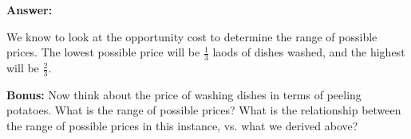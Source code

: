 \documentclass[12pt]{article}
\begin{document}
\begin{enumerate}
\medskip

\textbf{Answer:}

We know to look at the opportunity cost to determine the range of possible prices. The lowest possible price will be $\frac{1}{3}$ laods of dishes washed, and the highest will be $\frac{2}{3}$.


\medskip

\textbf{Bonus:} Now think about the price of washing dishes in terms of peeling potatoes. What is the range of possible prices? What is the relationship between the range of possible prices in this instance, vs. what we derived above?

\end{enumerate}
\end{document}
